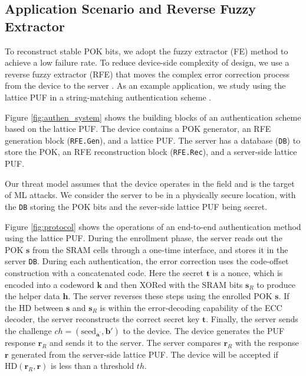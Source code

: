 \subsection{Application Scenario and Reverse Fuzzy Extractor}

To reconstruct stable POK bits, we adopt the fuzzy extractor (FE) \cite{dodis2004fuzzy} method to achieve a low failure rate. To reduce device-side complexity of design, we use a reverse fuzzy extractor (RFE) that moves the complex error correction process from the device to the server \cite{van2012reverse, xi2018fresh}. As an example application, we study using the lattice PUF in a string-matching authentication scheme \cite{suh2007physical}.

Figure \ref{fig:authen_system} shows the building blocks of an authentication scheme based on the lattice PUF. The device contains a POK generator, an RFE generation block (\texttt{RFE.Gen}), and a lattice PUF. The server has a database (\texttt{DB}) to store the POK, an RFE reconstruction block (\texttt{RFE.Rec}), and a server-side lattice PUF.

Our threat model assumes that the device operates in the field and is the target of ML attacks. We consider the server to be in a physically secure location, with the \texttt{DB} storing the POK bits and the sever-side lattice PUF being secret. %

Figure \ref{fig:protocol} shows the operations of an end-to-end authentication method using the lattice PUF. During the enrollment phase, the server reads out the POK $\mathbf{s}$ from the SRAM cells through a one-time interface, and stores it in the server \texttt{DB}. During each authentication, the error correction uses the code-offset construction with a concatenated code. Here the secret $\mathbf{t}$ is a nonce, which is encoded into a codeword $\mathbf{k}$ and then XORed with the SRAM bits $\mathbf{s}_R$ to produce the helper data $\mathbf{h}$. The server reverses these steps using the enrolled POK $\mathbf{s}$. If the HD between $\mathbf{s}$ and $\mathbf{s}_R$ is within the error-decoding capability of the ECC decoder, the server reconstructs the correct secret key $\mathbf{t}$. Finally, the server sends the challenge $ch=(\text{seed}_{\mathbf{a}^\prime}, \mathbf{b}')$ to the device. The device generates the PUF response $\mathbf{r}_R$ and sends it to the server. The server compares $\mathbf{r}_R$ with the response $\mathbf{r}$ generated from the server-side lattice PUF. The device will be accepted if $\text{HD}(\mathbf{r}_R, \mathbf{r})$ is less than a threshold $th$.